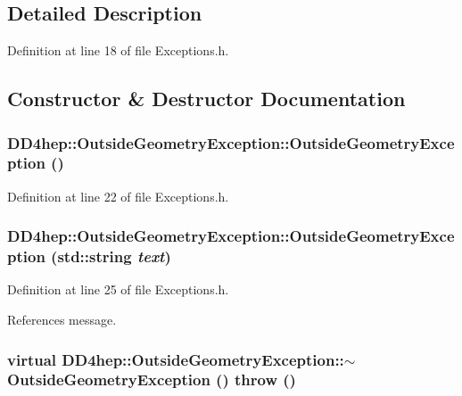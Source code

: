 \subsection{Detailed Description}


Definition at line 18 of file Exceptions.h.

\subsection{Constructor \& Destructor Documentation}
\hypertarget{class_d_d4hep_1_1_outside_geometry_exception_afcb996b89fe54d62d9c20068cb342812}{
\subsubsection[{OutsideGeometryException}]{\setlength{\rightskip}{0pt plus 5cm}DD4hep::OutsideGeometryException::OutsideGeometryException ()}}
\label{class_d_d4hep_1_1_outside_geometry_exception_afcb996b89fe54d62d9c20068cb342812}


Definition at line 22 of file Exceptions.h.\hypertarget{class_d_d4hep_1_1_outside_geometry_exception_a11e9856846c7f8f2acb85f2774558422}{
\subsubsection[{OutsideGeometryException}]{\setlength{\rightskip}{0pt plus 5cm}DD4hep::OutsideGeometryException::OutsideGeometryException (std::string {\em text})}}
\label{class_d_d4hep_1_1_outside_geometry_exception_a11e9856846c7f8f2acb85f2774558422}


Definition at line 25 of file Exceptions.h.

References message.\hypertarget{class_d_d4hep_1_1_outside_geometry_exception_a7e9be9d6e116f089183a65ab413daa56}{
\subsubsection[{$\sim$OutsideGeometryException}]{\setlength{\rightskip}{0pt plus 5cm}virtual DD4hep::OutsideGeometryException::$\sim$OutsideGeometryException ()  throw ()}}
\label{class_d_d4hep_1_1_outside_geometry_exception_a7e9be9d6e116f089183a65ab413daa56}


